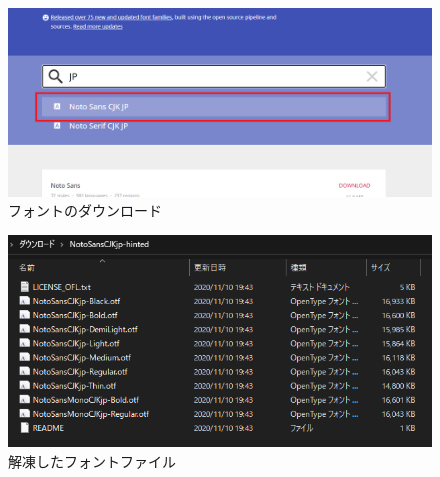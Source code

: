\documentclass[a4j]{jarticle}
\begin{document}
          \begin{figure}[H]
            \centering
            \includegraphics[scale=0.4]{fontdl.png}
            \caption{フォントのダウンロード}
             \label{dlpage2}
            \end{figure}

            \begin{figure}[H]
              \centering
              \includegraphics[scale=0.7]{dled.png}
              \caption{解凍したフォントファイル}
               \label{dled}
              \end{figure}
\end{document}
